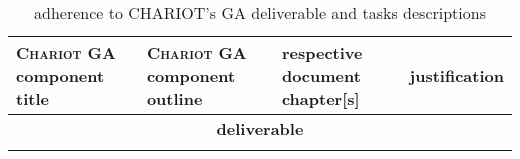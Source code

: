 \begin{table}[!htbp]
  \caption{\label{tab:mapchariot} adherence to CHARIOT's GA deliverable and tasks descriptions}
  \medskip
  \begin{relsize}{-1.3}
    \begin{tabular}{|p{}|p{}|p{}|p{}|}
      \hline \textbf{\textsc{Chariot} GA component title} &
      \textbf{\textsc{Chariot} GA component outline} &
      \textbf{respective document chapter[s]} & \textbf{justification}
      \\ \hline \multicolumn{4}{|c|}{{\large \textbf{deliverable}}}
      \\
      \hline
%
      \begin{minipage}[t]{0.18\textwidth}
        \smallskip
        

\end{minipage}
\end{tabular}
\end{relsize}
\end{table}
